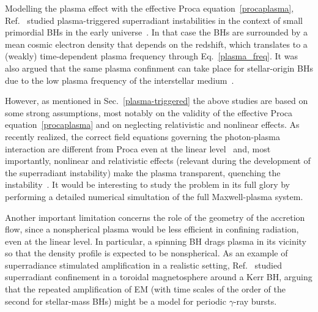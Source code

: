\documentclass[11pt]{article}
\numberwithin{equation}{section} %
\begin{document}
Modelling the plasma effect with the effective Proca equation~\eqref{procaplasma}, Ref.~\cite{Pani:2013hpa} studied 
plasma-triggered superradiant instabilities in the context of small primordial BHs in the early 
universe~\cite{Carr:2009jm}. In that case the BHs are surrounded by a mean cosmic electron density that depends on the 
redshift, which translates to a (weakly) time-dependent plasma frequency through Eq.~\eqref{plasma_freq}.
%
It was also argued that the same plasma confinment can take place for stellar-origin BHs due to the low plasma 
frequency of the interstellar medium~\cite{Conlon:2017hhi}.


However, as mentioned in Sec.~\ref{plasma-triggered} the above studies are based on some strong assumptions, most 
notably on the validity of the effective Proca equation~\eqref{procaplasma} and on neglecting relativistic and 
nonlinear effects. As recently realized, the correct field equations governing the photon-plasma interaction are 
different from Proca even at the linear level~\cite{Cannizzaro:2020uap} and, most importantly, nonlinear and 
relativistic effects (relevant during the development of the superradiant instability) make the plasma 
transparent, quenching the instability~\cite{Cardoso:2020nst,Blas:2020kaa}. It would be interesting to study the 
problem in its full glory by performing a detailed numerical simultation of the full Maxwell-plasma system. 

Another important limitation concerns the role of the geometry of the accretion flow, since a nonspherical plasma would 
be less efficient in confining radiation, even at the linear level. In particular, a spinning BH drags plasma in its 
vicinity so that the density profile is expected to be nonspherical. As an example of superradiance stimulated 
amplification in a realistic setting, Ref.~\cite{VanPutten:1999vda} studied superradiant confinement in a toroidal 
magnetosphere around a Kerr BH, arguing that the repeated amplification of EM (with time scales of the order of the 
second for stellar-mass BHs) might be a model for periodic $\gamma$-ray bursts.
\end{document}
